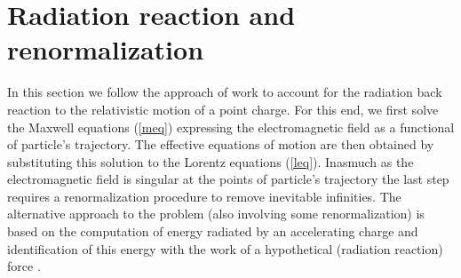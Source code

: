 \documentclass[a4paper,12pt]{article}
\begin{document}
\section{Radiation reaction and renormalization}

In this section we follow the approach of work  \cite{KLS} to
account for the radiation back reaction to the relativistic
motion of a point charge. For this end, we first solve the
Maxwell equations (\ref{meq}) expressing the electromagnetic
field as a functional of particle's trajectory. The effective
equations of motion are then obtained by substituting this
solution to the Lorentz equations (\ref{leq}). Inasmuch as the
electromagnetic field is singular at the points of particle's
trajectory the last step requires a renormalization procedure to
remove inevitable infinities. The alternative approach to the
problem (also involving some renormalization) is based on the
computation of energy radiated by an accelerating charge and
identification of this energy with the work of a hypothetical
(radiation reaction) force \cite{Dirac, Kos, TVW, Poisson}.
\end{document}
